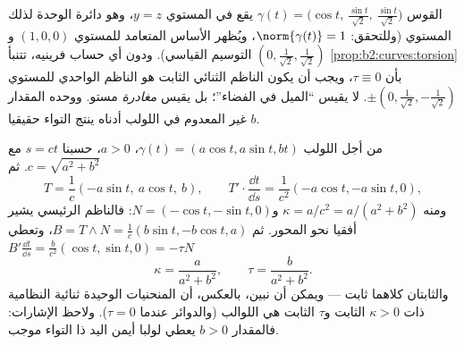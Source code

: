\begin{example}
القوس $\gamma(t) = \bigl(\cos t,\ \tfrac{\sin t}{\sqrt2},\
\tfrac{\sin t}{\sqrt2}\bigr)$ يقع في المستوي $y = z$، وهو دائرة الوحدة لذلك المستوي
(وللتحقق: $\norm{\gamma(t)} =
1$، ويُظهر الأساس المتعامد للمستوي $(1,0,0)$ و$(0, \tfrac1{\sqrt2}, \tfrac1{\sqrt2})$
التوسيم القياسي). ودون أي حساب فرينيه، تتنبأ \cref{prop:b2:curves:torsion} بأن $\tau \equiv 0$،
ويجب أن يكون الناظم الثنائي الثابت هو الناظم الواحدي للمستوي $\pm(0,
\tfrac1{\sqrt2}, -\tfrac1{\sqrt2})$.
 لا يقيس ``الميل في الفضاء''؛ بل يقيس \emph{مغادرة} مستو.
ووحده المقدار $b$ غير المعدوم في اللولب أدناه ينتج التواء حقيقيا.
\end{example}

\begin{example}[اللولب]\label{ex:b2:curves:helixfrenet}
من أجل اللولب $\gamma(t) = (a\cos t, a\sin t, bt)$، $a > 0$، حسبنا $s = ct$ مع $c = \sqrt{a^2 + b^2}$. ثم
\[
T = \frac1c(-a\sin t,\ a\cos t,\ b),
\qquad
T' \cdot \frac{\dd t}{\dd s}
= \frac{1}{c^2}(-a\cos t, -a\sin t, 0),
\]
ومنه $\kappa = a/c^2 = a/(a^2 + b^2)$ و$N = (-\cos t, -\sin t,
0)$: فالناظم الرئيسي يشير أفقيا نحو المحور. ثم
$B = T \wedge N = \frac1c(b\sin t, -b\cos t, a)$، وتعطي $B'
\frac{\dd t}{\dd s} = \frac{b}{c^2}(\cos t, \sin t, 0) = -\tau N$
\[
\boxed{\ \kappa = \frac{a}{a^2 + b^2}, \qquad
\tau = \frac{b}{a^2 + b^2}. \ }
\]
والثابتان كلاهما ثابت --- ويمكن أن نبين، بالعكس، أن المنحنيات
الوحيدة ثنائية النظامية ذات $\kappa > 0$ الثابت و$\tau$ الثابت هي
اللوالب (والدوائر عندما $\tau = 0$). ولاحظ الإشارات: فالمقدار $b >
0$
يعطي لولبا أيمن اليد ذا التواء موجب.
\end{example}

